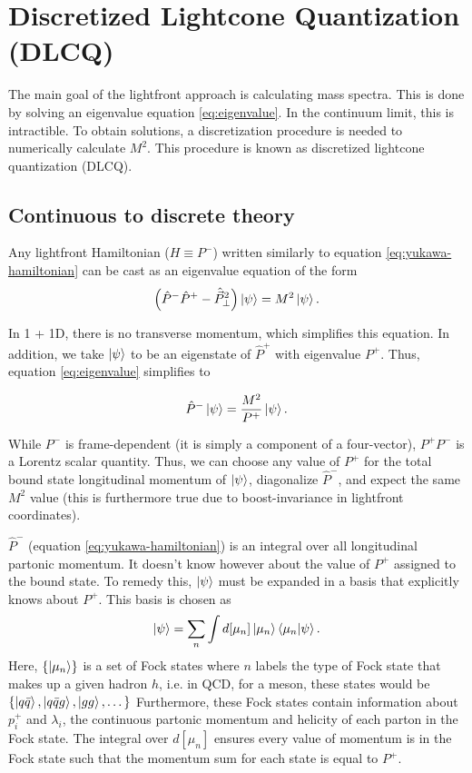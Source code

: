 \section{Discretized Lightcone Quantization (DLCQ)}
\label{sec:dlcq}

The main goal of the lightfront approach is calculating mass spectra. 
This is done by solving an eigenvalue equation \ref{eq:eigenvalue}.
In the continuum limit, this is intractible.
To obtain solutions, a discretization procedure is needed to numerically calculate $M^2$.
This procedure is known as discretized lightcone quantization (DLCQ).

\subsection{Continuous to discrete theory}
Any lightfront Hamiltonian ($H \equiv P^-$) written similarly to equation \ref{eq:yukawa-hamiltonian} can be cast as an eigenvalue equation of the form 
\begin{equation}
    \label{eq:eigenvalue}
    \left(\hat P^- \hat P^+ - \hat{\vec{P}}_\perp^2 \right)\ket{\psi} = M^2\ket{\psi}.
\end{equation}

In 1 + 1D, there is no transverse momentum, which simplifies this equation. 
In addition, we take $\ket{\psi}$ to be an eigenstate of $\hat P^+$ with eigenvalue $P^+$.
Thus, equation \ref{eq:eigenvalue} simplifies to 

\begin{equation}
    \label{eq:1p1Deigenvalue}
    \hat P^- \ket{\psi} = \frac{M^2}{P^+}\ket{\psi}.
\end{equation}

While $P^-$ is frame-dependent (it is simply a component of a four-vector), $P^+ P^-$ is a Lorentz scalar quantity. 
Thus, we can choose any value of $P^+$ for the total bound state longitudinal momentum of $\ket{\psi}$, diagonalize $\hat P^-$, and expect the same $M^2$ value (this is furthermore true due to boost-invariance in lightfront coordinates).

$\hat P^-$ (equation \ref{eq:yukawa-hamiltonian}) is an integral over all longitudinal partonic momentum. 
It doesn't know however about the value of $P^+$ assigned to the bound state. 
To remedy this, $\ket{\psi}$ must be expanded in a basis that explicitly knows about $P^+$.
This basis is chosen as $$\ket{\psi} = \sum_n \int d[\mu_n] \ket{\mu_n}\braket{\mu_n}{\psi}.$$
Here, $\{\ket{\mu_n} \}$ is a set of Fock states where $n$ labels the type of Fock state that makes up a given hadron $h$, i.e. in QCD, for a meson, these states would be $\{\ket{q\bar q}, \ket{q \bar qg}, \ket{gg}, \dots \}$
Furthermore, these Fock states contain information about $p_i^+$ and $\lambda_i$, the continuous partonic momentum and helicity of each parton in the Fock state. 
The integral over $d[\mu_n]$ ensures every value of momentum is in the Fock state such that the momentum sum for each state is equal to $P^+$.

